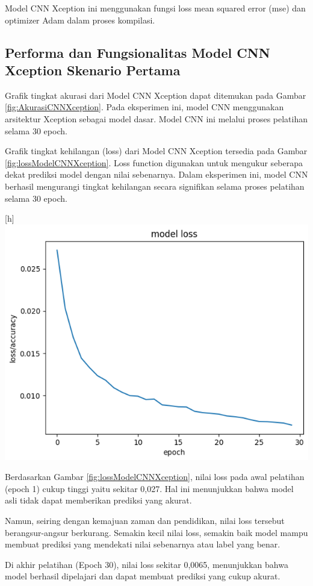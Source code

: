 Model CNN Xception ini menggunakan fungsi loss mean squared error (mse) dan optimizer Adam dalam proses kompilasi.

\subsection*{Performa dan Fungsionalitas Model CNN Xception Skenario Pertama}

Grafik tingkat akurasi dari Model CNN Xception dapat ditemukan pada Gambar \ref{fig:AkurasiCNNXception}. Pada eksperimen ini, model CNN menggunakan arsitektur Xception sebagai model dasar. Model CNN ini melalui proses pelatihan selama 30 epoch.

Grafik tingkat kehilangan (loss) dari Model CNN Xception tersedia pada Gambar \ref{fig:lossModelCNNXception}. Loss function digunakan untuk mengukur seberapa dekat prediksi model dengan nilai sebenarnya. Dalam eksperimen ini, model CNN berhasil mengurangi tingkat kehilangan secara signifikan selama proses pelatihan selama 30 epoch.

\begin{center}[h]
	\includegraphics[width=0.7\linewidth]{gambar/bener/Loss_ModelXception.png}
	\label{fig:lossModelCNNXception}
\end{center}
Berdasarkan Gambar \ref{fig:lossModelCNNXception}, nilai loss pada awal pelatihan (epoch 1) cukup tinggi yaitu sekitar 0,027. Hal ini menunjukkan bahwa model asli tidak dapat memberikan prediksi yang akurat.

Namun, seiring dengan kemajuan zaman dan pendidikan, nilai loss tersebut berangsur-angsur berkurang. Semakin kecil nilai loss, semakin baik model mampu membuat prediksi yang mendekati nilai sebenarnya atau label yang benar.

Di akhir pelatihan (Epoch 30), nilai loss sekitar 0,0065, menunjukkan bahwa model berhasil dipelajari dan dapat membuat prediksi yang cukup akurat.  

